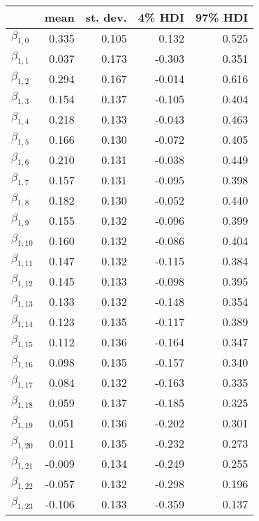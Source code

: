 \begin{tabular}{lrrrr}
\toprule
{} &   mean &  st. dev. &  4\% HDI &  97\% HDI \\
\midrule
$\beta_{1,0}$  &  0.335 &     0.105 &    0.132 &     0.525 \\
$\beta_{1,1}$  &  0.037 &     0.173 &   -0.303 &     0.351 \\
$\beta_{1,2}$  &  0.294 &     0.167 &   -0.014 &     0.616 \\
$\beta_{1,3}$  &  0.154 &     0.137 &   -0.105 &     0.404 \\
$\beta_{1,4}$  &  0.218 &     0.133 &   -0.043 &     0.463 \\
$\beta_{1,5}$  &  0.166 &     0.130 &   -0.072 &     0.405 \\
$\beta_{1,6}$  &  0.210 &     0.131 &   -0.038 &     0.449 \\
$\beta_{1,7}$  &  0.157 &     0.131 &   -0.095 &     0.398 \\
$\beta_{1,8}$  &  0.182 &     0.130 &   -0.052 &     0.440 \\
$\beta_{1,9}$  &  0.155 &     0.132 &   -0.096 &     0.399 \\
$\beta_{1,10}$ &  0.160 &     0.132 &   -0.086 &     0.404 \\
$\beta_{1,11}$ &  0.147 &     0.132 &   -0.115 &     0.384 \\
$\beta_{1,12}$ &  0.145 &     0.133 &   -0.098 &     0.395 \\
$\beta_{1,13}$ &  0.133 &     0.132 &   -0.148 &     0.354 \\
$\beta_{1,14}$ &  0.123 &     0.135 &   -0.117 &     0.389 \\
$\beta_{1,15}$ &  0.112 &     0.136 &   -0.164 &     0.347 \\
$\beta_{1,16}$ &  0.098 &     0.135 &   -0.157 &     0.340 \\
$\beta_{1,17}$ &  0.084 &     0.132 &   -0.163 &     0.335 \\
$\beta_{1,18}$ &  0.059 &     0.137 &   -0.185 &     0.325 \\
$\beta_{1,19}$ &  0.051 &     0.136 &   -0.202 &     0.301 \\
$\beta_{1,20}$ &  0.011 &     0.135 &   -0.232 &     0.273 \\
$\beta_{1,21}$ & -0.009 &     0.134 &   -0.249 &     0.255 \\
$\beta_{1,22}$ & -0.057 &     0.132 &   -0.298 &     0.196 \\
$\beta_{1,23}$ & -0.106 &     0.133 &   -0.359 &     0.137 \\

\end{tabular}
